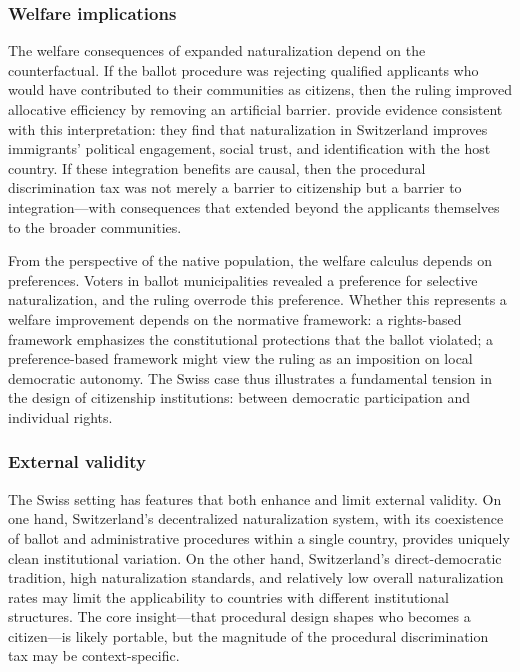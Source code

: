 \documentclass[12pt]{article}
\begin{document}
\subsubsection*{Welfare implications} The welfare consequences of expanded naturalization depend on the counterfactual. If the ballot procedure was rejecting qualified applicants who would have contributed to their communities as citizens, then the ruling improved allocative efficiency by removing an artificial barrier. \citet{hangartner2019} provide evidence consistent with this interpretation: they find that naturalization in Switzerland improves immigrants' political engagement, social trust, and identification with the host country. If these integration benefits are causal, then the procedural discrimination tax was not merely a barrier to citizenship but a barrier to integration---with consequences that extended beyond the applicants themselves to the broader communities.

From the perspective of the native population, the welfare calculus depends on preferences. Voters in ballot municipalities revealed a preference for selective naturalization, and the ruling overrode this preference. Whether this represents a welfare improvement depends on the normative framework: a rights-based framework emphasizes the constitutional protections that the ballot violated; a preference-based framework might view the ruling as an imposition on local democratic autonomy. The Swiss case thus illustrates a fundamental tension in the design of citizenship institutions: between democratic participation and individual rights.

\subsubsection*{External validity} The Swiss setting has features that both enhance and limit external validity. On one hand, Switzerland's decentralized naturalization system, with its coexistence of ballot and administrative procedures within a single country, provides uniquely clean institutional variation. On the other hand, Switzerland's direct-democratic tradition, high naturalization standards, and relatively low overall naturalization rates may limit the applicability to countries with different institutional structures. The core insight---that procedural design shapes who becomes a citizen---is likely portable, but the magnitude of the procedural discrimination tax may be context-specific.
\end{document}
